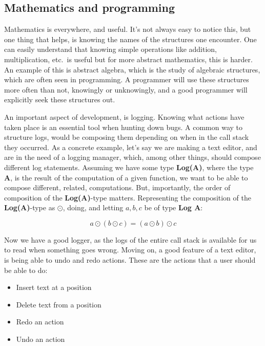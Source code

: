 \subsection{Mathematics and programming}

Mathematics is everywhere, and useful. It's not always easy to notice this, but
one thing that helps, is knowing the names of the structures one encounter. One
can easily understand that knowing simple operations like addition,
multiplication, etc.\ is useful but for more abstract mathematics, this is
harder. An example of this is abstract algebra, which is the study of algebraic
structures, which are often seen in programming. A programmer will use these
structures more often than not, knowingly or unknowingly, and a good programmer
will explicitly seek these structures out.

An important aspect of development, is logging. Knowing what actions have taken
place is an essential tool when hunting down bugs. A common way to structure
logs, would be composing them depending on when in the call stack they occurred.
As a concrete example, let's say we are making a text editor, and are in the
need of a logging manager, which, among other things, should compose different
log statements. Assuming we have some type \textbf{Log(A)}, where the type
\textbf{A}, is the result of the computation of a given function, we want to be
able to compose different, related, computations. But, importantly, the order of
composition of the \textbf{Log(A)}-type matters. Representing the composition of
the \textbf{Log(A)}-type as $\odot$, doing, and letting $a, b, c$ be of type
\textbf{Log A}:

\begin{definition} \label{def:logComp}
  \begin{equation}
    a \odot \left ( b \odot c \right ) = \left ( a \odot b \right ) \odot c
  \end{equation}
\end{definition}

Now we have a good logger, as the logs of the entire call stack is available for
us to read when something goes wrong. Moving on, a good feature of a text
editor, is being able to undo and redo actions. These are the actions that a
user should be able to do:

\begin{itemize}
  \item Insert text at a position
  \item Delete text from a position
  \item Redo an action
  \item Undo an action
\end{itemize}

